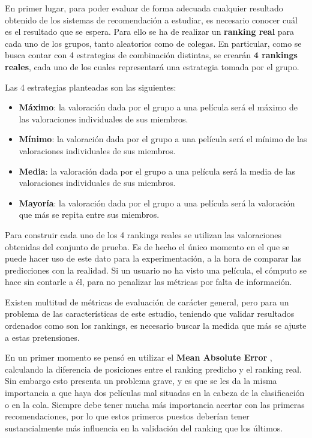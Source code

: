 En primer lugar, para poder evaluar de forma adecuada cualquier resultado obtenido de los sistemas de recomendación a estudiar, es necesario conocer cuál es el resultado que se espera. Para ello se ha de realizar un \textbf{ranking real} para cada uno de los grupos, tanto aleatorios como de colegas. En particular, como se busca contar con 4 estrategias de combinación distintas, se crearán \textbf{4 rankings reales}, cada uno de los cuales representará una estrategia tomada por el grupo.

Las 4 estrategias planteadas son las siguientes:

\begin{itemize}
	\item \textbf{Máximo}: la valoración dada por el grupo a una película será el máximo de las valoraciones individuales de sus miembros.
	\item \textbf{Mínimo}: la valoración dada por el grupo a una película será el mínimo de las valoraciones individuales de sus miembros.
	\item \textbf{Media}: la valoración dada por el grupo a una película será la media de las valoraciones individuales de sus miembros.
	\item \textbf{Mayoría}: la valoración dada por el grupo a una película será la valoración que más se repita entre sus miembros.
\end{itemize}

Para construir cada uno de los 4 rankings reales se utilizan las valoraciones obtenidas del conjunto de prueba. Es de hecho el único momento en el que se puede hacer uso de este dato para la experimentación, a la hora de comparar las predicciones con la realidad. Si un usuario no ha visto una película, el cómputo se hace sin contarle a él, para no penalizar las métricas por falta de información.

Existen multitud de métricas de evaluación de carácter general, pero para un problema de las características de este estudio, teniendo que validar resultados ordenados como son los rankings, es necesario buscar la medida que más se ajuste a estas pretensiones.

En un primer momento se pensó en utilizar el \textbf{Mean Absolute Error} \cite{mae-survey}, calculando la diferencia de posiciones entre el ranking predicho y el ranking real. Sin embargo esto presenta un problema grave, y es que se les da la misma importancia a que haya dos películas mal situadas en la cabeza de la clasificación o en la cola. Siempre debe tener mucha más importancia acertar con las primeras recomendaciones, por lo que estos primeros puestos deberían tener sustancialmente más influencia en la validación del ranking que los últimos.

